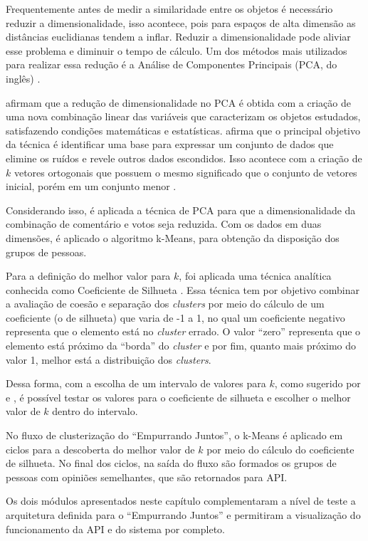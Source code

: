     Frequentemente antes de medir a similaridade entre os objetos é necessário
    reduzir a dimensionalidade, isso acontece, pois para espaços de alta dimensão as distâncias euclidianas
    tendem a inflar. Reduzir a dimensionalidade pode aliviar esse problema e diminuir o tempo de cálculo.
    Um dos métodos mais utilizados para realizar essa redução é a Análise de 
    Componentes Principais (PCA, do inglês) \cite{han2011data, sklearn}.

     afirmam que a redução de dimensionalidade no PCA é
    obtida com a criação de uma nova combinação linear das variáveis que caracterizam os
    objetos estudados, satisfazendo condições matemáticas e estatísticas.
     afirma que o principal objetivo da técnica é identificar
    uma base para expressar um conjunto de dados que elimine os ruídos e revele 
    outros dados escondidos. Isso acontece com a criação de $k$ vetores ortogonais que possuem o mesmo significado que o conjunto
    de vetores inicial, porém em um conjunto menor \cite{han2011data}. 
    
    Considerando isso, é aplicada a técnica de PCA para que
    a dimensionalidade da combinação de comentário e votos seja reduzida. 
    Com os dados em duas dimensões, é aplicado o algoritmo k-Means, para obtenção da disposição dos grupos de pessoas. 
    
    Para a definição do melhor valor para $k$, foi aplicada uma técnica analítica conhecida como Coeficiente de Silhueta \cite{sklearn}.  
    Essa técnica tem por objetivo combinar a avaliação de coesão e separação dos \textit{clusters} por meio do cálculo de um coeficiente (o de silhueta) que 
    varia de -1 a 1, no qual um coeficiente negativo representa que o elemento está no \textit{cluster} errado.
    O valor ``zero'' representa que o elemento está próximo da ``borda'' do \textit{cluster} e por fim, quanto mais próximo do valor 1, melhor
    está a distribuição dos \textit{clusters}.

    Dessa forma, com a escolha de um intervalo de valores para $k$, como sugerido por  e , é possível testar os valores 
    para o coeficiente de silhueta e escolher o melhor valor de $k$ dentro do intervalo. 

    No fluxo de clusterização do ``Empurrando Juntos'', o k-Means é aplicado em ciclos para a descoberta do melhor valor de 
    $k$ por meio do cálculo do coeficiente de silhueta.
    No final dos ciclos, na saída do fluxo são formados os grupos de pessoas com opiniões semelhantes, que são retornados para API.
 
    Os dois módulos apresentados neste capítulo complementaram a nível de teste a arquitetura definida para o ``Empurrando Juntos'' e permitiram 
    a visualização do funcionamento da API e do sistema por completo.